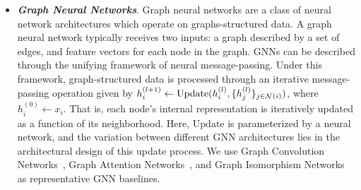 \begin{itemize}
    \item \textbf{\textit{Graph Neural Networks}}. Graph neural networks are a class of neural network architectures which operate on graphs-structured data. A graph neural network typically receives two inputs: a graph described by a set of edges, and feature vectors for each node in the graph. GNNs can be described through the unifying framework of neural message-passing. Under this framework, graph-structured data is processed through an iterative message-passing operation given by $h_i^{(l+1)} \gets \mathrm{Update}(h_i^{(l)}, \{h_j^{(l)}\}_{j \in {\mathcal{N}}(i)})$, where $h_i^{(0)} \gets x_i$. That is, each node's internal representation is iteratively updated as a function of its neighborhood. Here, $\mathrm{Update}$ is parameterized by a neural network, and the variation between different GNN architectures lies in the architectural design of this update process. We use Graph Convolution Networks~\citep{kipfSemiSupervisedClassificationGraph2017}, Graph Attention Networks~\citep{velickovicGraphAttentionNetworks2017}, and Graph Isomorphism Networks~\citep{xuHowPowerfulAre2018} as representative GNN baselines.
\end{itemize}




